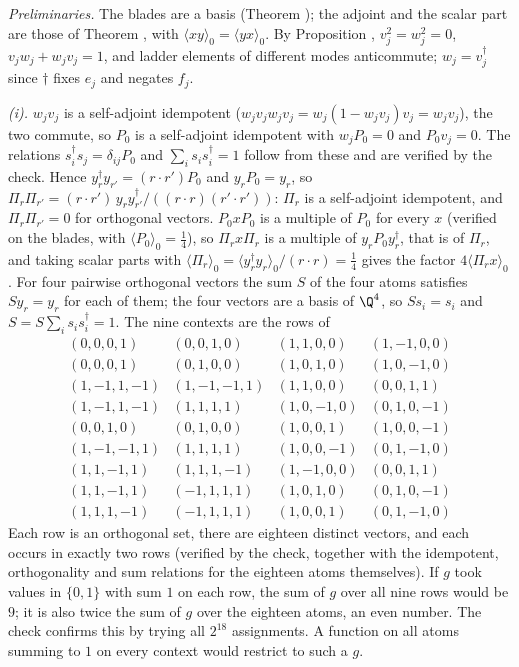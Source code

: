 \emph{Preliminaries.} The blades are a basis (Theorem ); the adjoint and the scalar part are those of Theorem , with $\langle xy\rangle_{0} = \langle yx\rangle_{0}$. By Proposition , $v_{j}^{2} = w_{j}^{2} = 0$, $v_{j}w_{j} + w_{j}v_{j} = 1$, and ladder elements of different modes anticommute; $w_{j} = v_{j}^{\dagger}$ since $\dagger$ fixes $e_{j}$ and negates $f_{j}$.

\emph{(i).} $w_{j}v_{j}$ is a self-adjoint idempotent ($w_{j}v_{j}w_{j}v_{j} = w_{j}(1 - w_{j}v_{j})v_{j} = w_{j}v_{j}$), the two commute, so $P_{0}$ is a self-adjoint idempotent with $w_{j}P_{0} = 0$ and $P_{0}v_{j} = 0$. The relations $s_{i}^{\dagger}s_{j} = \delta_{ij}P_{0}$ and $\sum_{i}s_{i}s_{i}^{\dagger} = 1$ follow from these and are verified by the check. Hence $y_{r}^{\dagger}y_{r'} = (r \cdot r')P_{0}$ and $y_{r}P_{0} = y_{r}$, so $\Pi_{r}\Pi_{r'} = (r \cdot r')\,y_{r}y_{r'}^{\dagger}/((r \cdot r)(r' \cdot r'))$: $\Pi_{r}$ is a self-adjoint idempotent, and $\Pi_{r}\Pi_{r'} = 0$ for orthogonal vectors. $P_{0}xP_{0}$ is a multiple of $P_{0}$ for every $x$ (verified on the blades, with $\langle P_{0}\rangle_{0} = \tfrac14$), so $\Pi_{r}x\Pi_{r}$ is a multiple of $y_{r}P_{0}y_{r}^{\dagger}$, that is of $\Pi_{r}$, and taking scalar parts with $\langle\Pi_{r}\rangle_{0} = \langle y_{r}^{\dagger}y_{r}\rangle_{0}/(r \cdot r) = \tfrac14$ gives the factor $4\langle\Pi_{r}x\rangle_{0}$. For four pairwise orthogonal vectors the sum $S$ of the four atoms satisfies $Sy_{r} = y_{r}$ for each of them; the four vectors are a basis of $\Q^{4}$, so $Ss_{i} = s_{i}$ and $S = S\sum_{i}s_{i}s_{i}^{\dagger} = 1$. The nine contexts are the rows of
\[
\begin{array}{llll}
(0,0,0,1) & (0,0,1,0) & (1,1,0,0) & (1,-1,0,0) \\
(0,0,0,1) & (0,1,0,0) & (1,0,1,0) & (1,0,-1,0) \\
(1,-1,1,-1) & (1,-1,-1,1) & (1,1,0,0) & (0,0,1,1) \\
(1,-1,1,-1) & (1,1,1,1) & (1,0,-1,0) & (0,1,0,-1) \\
(0,0,1,0) & (0,1,0,0) & (1,0,0,1) & (1,0,0,-1) \\
(1,-1,-1,1) & (1,1,1,1) & (1,0,0,-1) & (0,1,-1,0) \\
(1,1,-1,1) & (1,1,1,-1) & (1,-1,0,0) & (0,0,1,1) \\
(1,1,-1,1) & (-1,1,1,1) & (1,0,1,0) & (0,1,0,-1) \\
(1,1,1,-1) & (-1,1,1,1) & (1,0,0,1) & (0,1,-1,0)
\end{array}
\]
Each row is an orthogonal set, there are eighteen distinct vectors, and each occurs in exactly two rows (verified by the check, together with the idempotent, orthogonality and sum relations for the eighteen atoms themselves). If $g$ took values in $\{0, 1\}$ with sum $1$ on each row, the sum of $g$ over all nine rows would be $9$; it is also twice the sum of $g$ over the eighteen atoms, an even number. The check confirms this by trying all $2^{18}$ assignments. A function on all atoms summing to $1$ on every context would restrict to such a $g$.


